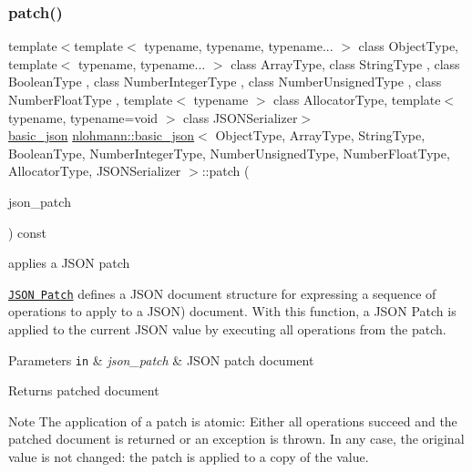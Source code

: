 \subsubsection{\texorpdfstring{patch()}{patch()}}
{\footnotesize\ttfamily template$<$template$<$ typename, typename, typename... $>$ class Object\+Type, template$<$ typename, typename... $>$ class Array\+Type, class String\+Type , class Boolean\+Type , class Number\+Integer\+Type , class Number\+Unsigned\+Type , class Number\+Float\+Type , template$<$ typename $>$ class Allocator\+Type, template$<$ typename, typename=void $>$ class J\+S\+O\+N\+Serializer$>$ \\
\hyperlink{classnlohmann_1_1basic__json}{basic\+\_\+json} \hyperlink{classnlohmann_1_1basic__json}{nlohmann\+::basic\+\_\+json}$<$ Object\+Type, Array\+Type, String\+Type, Boolean\+Type, Number\+Integer\+Type, Number\+Unsigned\+Type, Number\+Float\+Type, Allocator\+Type, J\+S\+O\+N\+Serializer $>$\+::patch (\begin{DoxyParamCaption}\item[{const \hyperlink{classnlohmann_1_1basic__json}{basic\+\_\+json}$<$ Object\+Type, Array\+Type, String\+Type, Boolean\+Type, Number\+Integer\+Type, Number\+Unsigned\+Type, Number\+Float\+Type, Allocator\+Type, J\+S\+O\+N\+Serializer $>$ \&}]{json\+\_\+patch }\end{DoxyParamCaption}) const\hspace{0.3cm}{\ttfamily [inline]}}



applies a J\+S\+ON patch 

\href{http://jsonpatch.com}{\tt J\+S\+ON Patch} defines a J\+S\+ON document structure for expressing a sequence of operations to apply to a J\+S\+ON) document. With this function, a J\+S\+ON Patch is applied to the current J\+S\+ON value by executing all operations from the patch.


\begin{DoxyParams}[1]{Parameters}
\mbox{\tt in}  & {\em json\+\_\+patch} & J\+S\+ON patch document \\
\hline
\end{DoxyParams}
\begin{DoxyReturn}{Returns}
patched document
\end{DoxyReturn}
\begin{DoxyNote}{Note}
The application of a patch is atomic\+: Either all operations succeed and the patched document is returned or an exception is thrown. In any case, the original value is not changed\+: the patch is applied to a copy of the value.
\end{DoxyNote}


